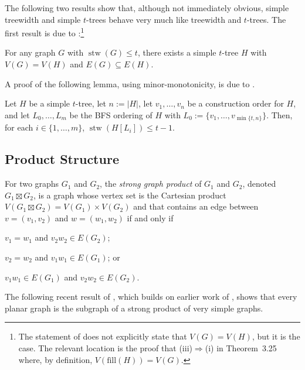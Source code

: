 \documentclass[kpfonts]{patmorin}
\DeclareMathOperator{\stw}{stw}
\theoremstyle{named}
\begin{document}
The following two results show that, although not immediately obvious, simple treewidth and simple $t$-trees behave very much like treewidth and $t$-trees.  The first result is due to \citet[Theorem~3.27]{wulf:stacked}:\footnote{The statement of \cite[Theorem~3.27]{wulf:stacked} does not explicitly state that $V(G)=V(H)$, but it is the case.  The relevant location is the proof that (iii)$\Rightarrow$(i) in Theorem~3.25 where, by definition, $V(\mathrm{fill}(H))=V(G)$.}

\begin{lem}\label{simple-subgraph}
    For any graph $G$ with $\stw(G)\le t$, there exists a simple $t$-tree $H$ with $V(G)= V(H)$ and $E(G)\subseteq E(H)$.
\end{lem}

A proof of the following lemma, using minor-monotonicity, is due to \citet{wood:personal}.

\begin{lem}\label{simple-bfs-layers}
    Let $H$ be a simple $t$-tree, let $n:=|H|$, let $v_1,\ldots,v_n$ be a construction order for $H$, and let $L_0,\ldots,L_m$ be the BFS ordering of $H$ with $L_0:=\{v_1,\ldots,v_{\min\{t,n\}}\}$.   Then, for each $i\in\{1,\ldots,m\}$, $\stw(H[L_i])\le t-1$.
\end{lem}


\subsection{Product Structure}

For two graphs $G_1$ and $G_2$, the \emph{strong graph product} of $G_1$ and $G_2$, denoted $G_1\boxtimes G_2$, is a graph whose vertex set is the Cartesian product $V(G_1\boxtimes G_2)= V(G_1)\times V(G_2)$ and that contains an edge between $v=(v_1,v_2)$ and $w=(w_1,w_2)$ if and only if
\begin{inparaenum}[(i)]
    \item $v_1=w_1$ and $v_2w_2\in E(G_2)$;
    \item $v_2=w_2$ and $v_1w_1\in E(G_1)$; or
    \item $v_1w_1\in E(G_1)$ and $v_2w_2\in E(G_2)$.
\end{inparaenum}

The following recent result of \citet{dujmovic.joret.ea:planar}, which builds on earlier work of \citet{pilipczuk.siebertz:polynomial}, shows that every planar graph is the subgraph of a strong product of very simple graphs.
\end{document}
